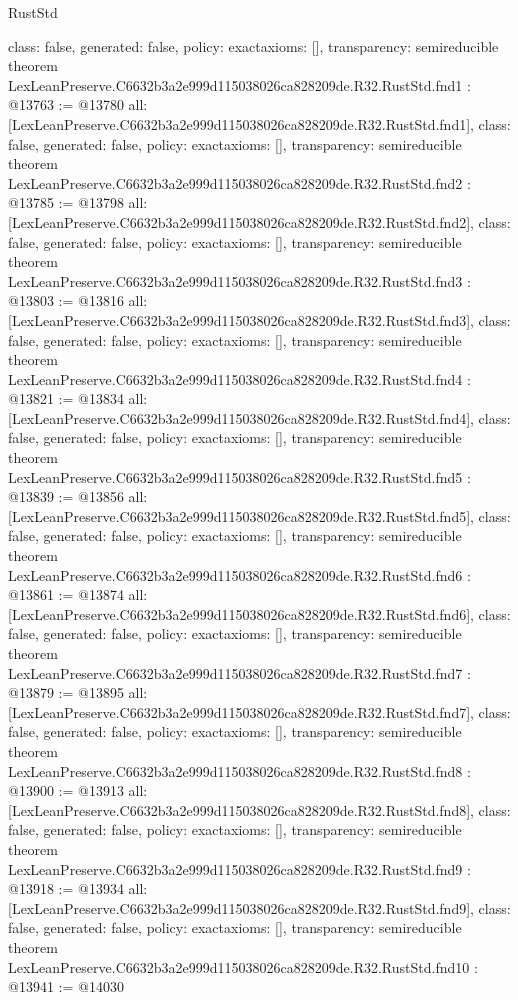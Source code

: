 \begin{lexlean}{RustStd}
\begin{coremodule}
{  class: false,
  generated: false,
  policy: exact{axioms: []},
  transparency: semireducible
}
theorem LexLeanPreserve.C6632b3a2e999d115038026ca828209de.R32.RustStd.fnd1 : @13763 := @13780 {
  all: [LexLeanPreserve.C6632b3a2e999d115038026ca828209de.R32.RustStd.fnd1],
  class: false,
  generated: false,
  policy: exact{axioms: []},
  transparency: semireducible
}
theorem LexLeanPreserve.C6632b3a2e999d115038026ca828209de.R32.RustStd.fnd2 : @13785 := @13798 {
  all: [LexLeanPreserve.C6632b3a2e999d115038026ca828209de.R32.RustStd.fnd2],
  class: false,
  generated: false,
  policy: exact{axioms: []},
  transparency: semireducible
}
theorem LexLeanPreserve.C6632b3a2e999d115038026ca828209de.R32.RustStd.fnd3 : @13803 := @13816 {
  all: [LexLeanPreserve.C6632b3a2e999d115038026ca828209de.R32.RustStd.fnd3],
  class: false,
  generated: false,
  policy: exact{axioms: []},
  transparency: semireducible
}
theorem LexLeanPreserve.C6632b3a2e999d115038026ca828209de.R32.RustStd.fnd4 : @13821 := @13834 {
  all: [LexLeanPreserve.C6632b3a2e999d115038026ca828209de.R32.RustStd.fnd4],
  class: false,
  generated: false,
  policy: exact{axioms: []},
  transparency: semireducible
}
theorem LexLeanPreserve.C6632b3a2e999d115038026ca828209de.R32.RustStd.fnd5 : @13839 := @13856 {
  all: [LexLeanPreserve.C6632b3a2e999d115038026ca828209de.R32.RustStd.fnd5],
  class: false,
  generated: false,
  policy: exact{axioms: []},
  transparency: semireducible
}
theorem LexLeanPreserve.C6632b3a2e999d115038026ca828209de.R32.RustStd.fnd6 : @13861 := @13874 {
  all: [LexLeanPreserve.C6632b3a2e999d115038026ca828209de.R32.RustStd.fnd6],
  class: false,
  generated: false,
  policy: exact{axioms: []},
  transparency: semireducible
}
theorem LexLeanPreserve.C6632b3a2e999d115038026ca828209de.R32.RustStd.fnd7 : @13879 := @13895 {
  all: [LexLeanPreserve.C6632b3a2e999d115038026ca828209de.R32.RustStd.fnd7],
  class: false,
  generated: false,
  policy: exact{axioms: []},
  transparency: semireducible
}
theorem LexLeanPreserve.C6632b3a2e999d115038026ca828209de.R32.RustStd.fnd8 : @13900 := @13913 {
  all: [LexLeanPreserve.C6632b3a2e999d115038026ca828209de.R32.RustStd.fnd8],
  class: false,
  generated: false,
  policy: exact{axioms: []},
  transparency: semireducible
}
theorem LexLeanPreserve.C6632b3a2e999d115038026ca828209de.R32.RustStd.fnd9 : @13918 := @13934 {
  all: [LexLeanPreserve.C6632b3a2e999d115038026ca828209de.R32.RustStd.fnd9],
  class: false,
  generated: false,
  policy: exact{axioms: []},
  transparency: semireducible
}
theorem LexLeanPreserve.C6632b3a2e999d115038026ca828209de.R32.RustStd.fnd10 : @13941 := @14030 {
}
\end{coremodule}
\end{lexlean}
